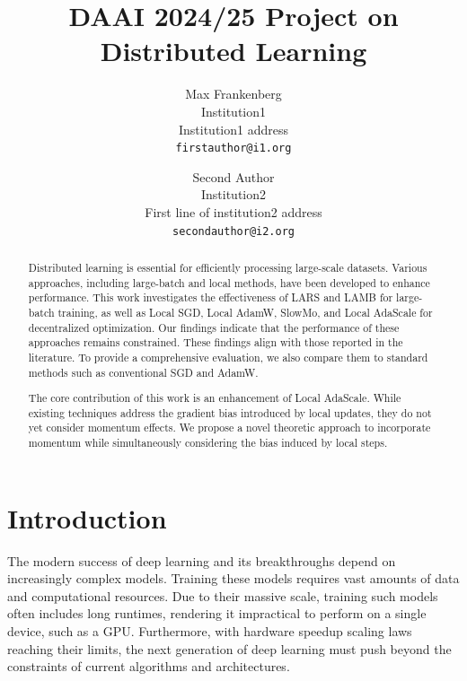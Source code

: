 \documentclass[10pt,twocolumn,letterpaper]{article}
\begin{document}
\title{DAAI 2024/25 Project on Distributed Learning}

\author{Max Frankenberg\\
Institution1\\
Institution1 address\\
{\tt\small firstauthor@i1.org}
\and
Second Author\\
Institution2\\
First line of institution2 address\\
{\tt\small secondauthor@i2.org}
}
\maketitle
\begin{abstract}
Distributed learning is essential for efficiently processing large-scale datasets. Various approaches, including large-batch and local methods, have been developed to enhance performance. This work investigates the effectiveness of LARS and LAMB for large-batch training, as well as Local SGD, Local AdamW, SlowMo, and Local AdaScale for decentralized optimization. Our findings indicate that the performance of these approaches remains constrained. These findings align with those reported in the literature. To provide a comprehensive evaluation, we also compare them to standard methods such as conventional SGD and AdamW.

The core contribution of this work is an enhancement of Local AdaScale. While existing techniques address the gradient bias introduced by local updates, they do not yet consider momentum effects. We propose a novel theoretic approach to incorporate momentum while simultaneously considering the bias induced by local steps.
\end{abstract}

\section{Introduction}

The modern success of deep learning and its breakthroughs depend on increasingly complex models. Training these models requires vast amounts of data and computational resources. Due to their massive scale, training such models often includes long runtimes, rendering it impractical to perform on a single device, such as a GPU. Furthermore, with hardware speedup scaling laws reaching their limits, the next generation of deep learning must push beyond the constraints of current algorithms and architectures.\\
\end{document}
